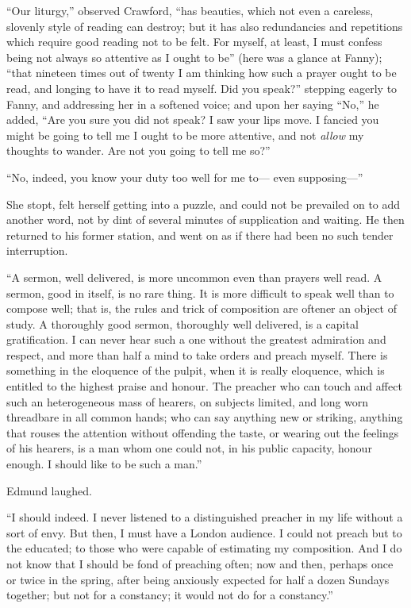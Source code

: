 ``Our liturgy,'' observed Crawford, ``has beauties, which not
even a careless, slovenly style of reading can destroy;
but it has also redundancies and repetitions which require
good reading not to be felt.  For myself, at least, I must
confess being not always so attentive as I ought to be''
(here was a glance at Fanny); ``that nineteen times out of
twenty I am thinking how such a prayer ought to be read,
and longing to have it to read myself.  Did you speak?''
stepping eagerly to Fanny, and addressing her in a
softened voice; and upon her saying ``No,'' he added,
``Are you sure you did not speak?  I saw your lips move.
I fancied you might be going to tell me I ought to be
more attentive, and not \emph{allow} my thoughts to wander.
Are not you going to tell me so?''

``No, indeed, you know your duty too well for me to---%
even supposing---''

She stopt, felt herself getting into a puzzle, and could
not be prevailed on to add another word, not by dint
of several minutes of supplication and waiting.  He then
returned to his former station, and went on as if there
had been no such tender interruption.

``A sermon, well delivered, is more uncommon even than prayers
well read.  A sermon, good in itself, is no rare thing.
It is more difficult to speak well than to compose well;
that is, the rules and trick of composition are
oftener an object of study.  A thoroughly good sermon,
thoroughly well delivered, is a capital gratification.
I can never hear such a one without the greatest admiration
and respect, and more than half a mind to take orders
and preach myself.  There is something in the eloquence
of the pulpit, when it is really eloquence, which is entitled
to the highest praise and honour.  The preacher who can
touch and affect such an heterogeneous mass of hearers,
on subjects limited, and long worn threadbare in all
common hands; who can say anything new or striking,
anything that rouses the attention without offending the taste,
or wearing out the feelings of his hearers, is a man whom
one could not, in his public capacity, honour enough.
I should like to be such a man.''

Edmund laughed.

``I should indeed.  I never listened to a distinguished
preacher in my life without a sort of envy.  But then,
I must have a London audience.  I could not preach but
to the educated; to those who were capable of estimating
my composition.  And I do not know that I should be fond
of preaching often; now and then, perhaps once or twice
in the spring, after being anxiously expected for half
a dozen Sundays together; but not for a constancy;
it would not do for a constancy.''

